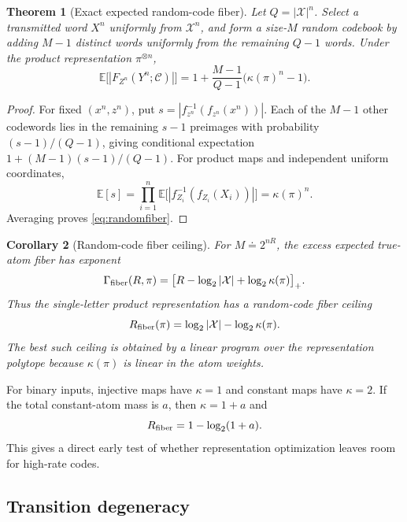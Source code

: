 \documentclass[11pt]{article}
\newtheorem{theorem}{Theorem}[section]
\newtheorem{corollary}[theorem]{Corollary}
\theoremstyle{definition}
\theoremstyle{remark}
\newcommand{\X}{\mathcal X}
\newcommand{\C}{\mathcal C}
\newcommand{\E}{\mathbb E}
\begin{document}
\begin{theorem}[Exact expected random-code fiber]
Let $Q=|\X|^n$. Select a transmitted word $X^n$ uniformly from $\X^n$, and form a size-$M$ random codebook by adding $M-1$ distinct words uniformly from the remaining $Q-1$ words. Under the product representation $\pi^{\otimes n}$,
\begin{equation}
 \E\big[|F_{Z^n}(Y^n;\C)|\big]
 =1+\frac{M-1}{Q-1}\big(\kappa(\pi)^n-1\big).
 \label{eq:randomfiber}
\end{equation}
\end{theorem}

\begin{proof}
For fixed $(x^n,z^n)$, put $s=|f_{z^n}^{-1}(f_{z^n}(x^n))|$. Each of the $M-1$ other codewords lies in the remaining $s-1$ preimages with probability $(s-1)/(Q-1)$, giving conditional expectation $1+(M-1)(s-1)/(Q-1)$. For product maps and independent uniform coordinates,
\[
\E[s]=\prod_{i=1}^{n}\E\big[|f_{Z_i}^{-1}(f_{Z_i}(X_i))|\big]=\kappa(\pi)^n.
\]
Averaging proves \eqref{eq:randomfiber}.
\end{proof}

\begin{corollary}[Random-code fiber ceiling]
For $M\doteq 2^{nR}$, the excess expected true-atom fiber has exponent
\begin{equation}
 \Gamma_{\rm fiber}(R,\pi)=
 \big[R-\log_2|\X|+\log_2\kappa(\pi)\big]_+.
 \label{eq:fiberexp}
\end{equation}
Thus the single-letter product representation has a random-code fiber ceiling
\begin{equation}
 R_{\rm fiber}(\pi)=\log_2|\X|-\log_2\kappa(\pi).
 \label{eq:fiberceiling}
\end{equation}
The best such ceiling is obtained by a linear program over the representation polytope because $\kappa(\pi)$ is linear in the atom weights.
\end{corollary}

For binary inputs, injective maps have $\kappa=1$ and constant maps have $\kappa=2$. If the total constant-atom mass is $a$, then $\kappa=1+a$ and
\begin{equation}
 R_{\rm fiber}=1-\log_2(1+a).
 \label{eq:binaryceiling}
\end{equation}
This gives a direct early test of whether representation optimization leaves room for high-rate codes.

\subsection{Transition degeneracy}
\end{document}
